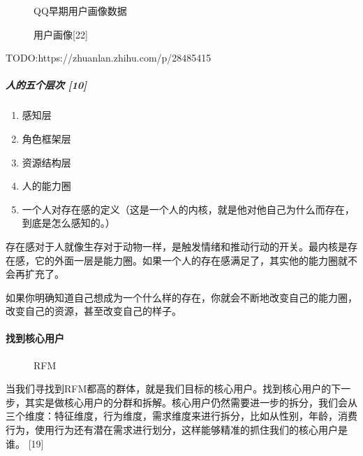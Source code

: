 \documentclass[letterpaper,10pt,english]{sphinxmanual}
\begin{document}
\begin{figure}[H]
\centering
\capstart

\noindent{}
\caption{QQ早期用户画像数据}\label{\detokenize{chapter_knowledge/users_analysis:id38}}\end{figure}

\begin{figure}[H]
\centering
\capstart

\noindent{}
\caption{用户画像{[}22{]}}\label{\detokenize{chapter_knowledge/users_analysis:id39}}\end{figure}

TODO:https://zhuanlan.zhihu.com/p/28485415


\subparagraph{人的五个层次 {[}10{]}}
\label{\detokenize{chapter_knowledge/users_analysis:id13}}\begin{enumerate}
%
\item {} 
感知层

\item {} 
角色框架层

\item {} 
资源结构层

\item {} 
人的能力圈

\item {} 
一个人对存在感的定义（这是一个人的内核，就是他对他自己为什么而存在，到底是怎么感知的。）

\end{enumerate}

存在感对于人就像生存对于动物一样，是触发情绪和推动行动的开关。最内核是存在感，它的外面一层是能力圈。如果一个人的存在感满足了，其实他的能力圈就不会再扩充了。

如果你明确知道自己想成为一个什么样的存在，你就会不断地改变自己的能力圈，改变自己的资源，甚至改变自己的样子。


\paragraph{找到核心用户}
\label{\detokenize{chapter_knowledge/users_analysis:id14}}
\begin{figure}[H]
\centering
\capstart

\noindent{}
\caption{RFM}\label{\detokenize{chapter_knowledge/users_analysis:id40}}\end{figure}

当我们寻找到RFM都高的群体，就是我们目标的核心用户。找到核心用户的下一步，其实是做核心用户的分群和拆解。核心用户仍然需要进一步的拆分，我们会从三个维度：特征维度，行为维度，需求维度来进行拆分，比如从性别，年龄，消费行为，使用行为还有潜在需求进行划分，这样能够精准的抓住我们的核心用户是谁。
{[}19{]}
\end{document}
